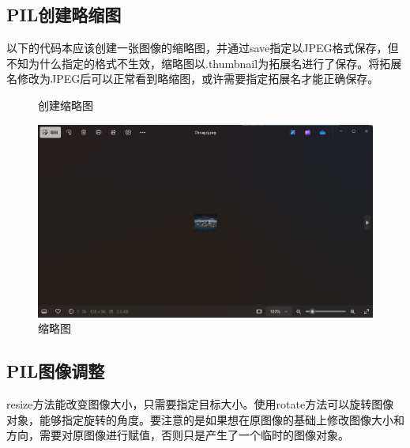 \documentclass[fontset=ubuntu]{ctexart}
\begin{document}
\subsection{PIL创建略缩图}
以下的代码本应该创建一张图像的缩略图，并通过save指定以JPEG格式保存，但不知为什么指定的格式不生效，缩略图以.thumbnail为拓展名进行了保存。将拓展名修改为JPEG后可以正常看到略缩图，或许需要指定拓展名才能正确保存。
\begin{figure}[htb]
    \centering
    \caption{创建缩略图}
    \label{thmubnails}
\end{figure}

\begin{figure}[htb]
    \centering
    \includegraphics[width=0.4\linewidth]{thumbnails_3.png}
    \caption{缩略图}
    \label{fig:thumbnails_3}
\end{figure}

\subsection{PIL图像调整}
resize方法能改变图像大小，只需要指定目标大小。使用rotate方法可以旋转图像对象，能够指定旋转的角度。要注意的是如果想在原图像的基础上修改图像大小和方向，需要对原图像进行赋值，否则只是产生了一个临时的图像对象。
\end{document}
